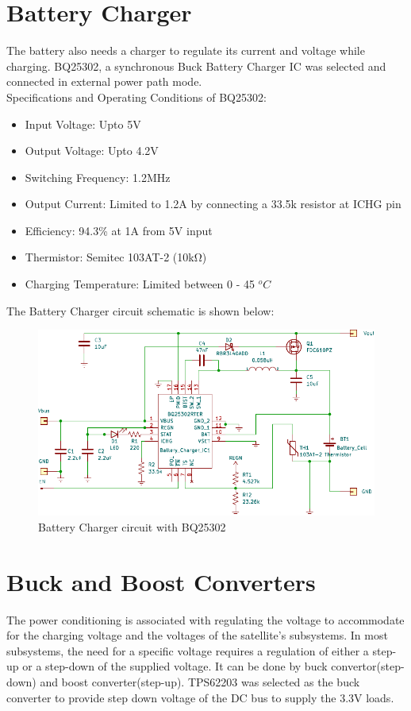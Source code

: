 \section[Battery Charger]{Battery Charger}
 The battery also needs a charger to regulate its current and voltage while charging.
 BQ25302, a synchronous Buck Battery Charger IC was selected and connected in external power path mode.\\
 
 Specifications and Operating Conditions of BQ25302:
\begin{itemize}
 	\item Input Voltage: Upto 5V
 	\item Output Voltage: Upto 4.2V
 	\item Switching Frequency: 1.2MHz
 	\item Output Current: Limited to 1.2A by connecting a 33.5k resistor at ICHG pin 
 	\item Efficiency: 94.3\% at 1A from 5V input 
 	\item Thermistor: Semitec 103AT-2 (10\si{\kilo\ohm})
 	\item Charging Temperature: Limited between 0 - 45 $^{o}C$
 \end{itemize}

The Battery Charger circuit schematic is shown below:
\begin{figure}[ht]
	\centering
	\includegraphics[width=\columnwidth]{batt2.pdf}
	\caption{Battery Charger circuit with BQ25302}
	\label{fig:battch}
\end{figure}


\section[Switching Regulators]{Buck and Boost Converters}
The power conditioning is associated with regulating the voltage to accommodate
for the charging voltage and the voltages of the satellite's subsystems. In most
subsystems, the need for a specific voltage requires a regulation of either a step-up
or a step-down of the supplied voltage. It can be done by buck
convertor(step-down) and boost converter(step-up).
TPS62203 was selected as the buck converter to provide step down voltage of the DC bus to supply the 3.3V loads.\\

